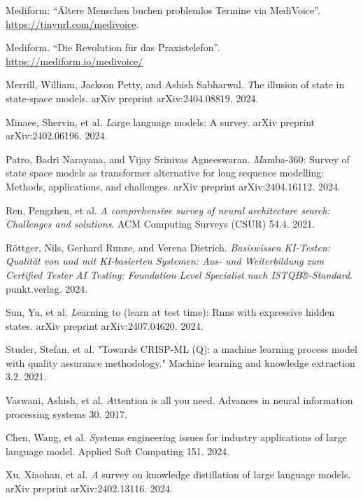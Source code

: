 \documentclass[twocolumn]{article}
\begin{document}
\begin{thebibliography}{99}
 Mediform: “Ältere Menschen buchen problemlos Termine via MediVoice”. \url{https://tinyurl.com/medivoice}.

 Mediform. “Die Revolution für das Praxistelefon”. \url{https://mediform.io/medivoice/}

 Merrill, William, Jackson Petty, and Ashish Sabharwal. {\emph The illusion of state in state-space models}. arXiv preprint arXiv:2404.08819. 2024.
  
 Minaee, Shervin, et al. {\emph Large language models: A survey}. arXiv preprint arXiv:2402.06196. 2024.

 Patro, Badri Narayana, and Vijay Srinivas Agneeswaran. {\emph Mamba-360: Survey of state space models as transformer alternative for long sequence modelling: Methods, applications, and challenges}. arXiv preprint arXiv:2404.16112. 2024.
  
 Ren, Pengzhen, et al. \emph{A comprehensive survey of neural architecture search: Challenges and solutions}. ACM Computing Surveys (CSUR) 54.4. 2021.
  
 Röttger, Nils, Gerhard Runze, and Verena Dietrich. \emph{Basiswissen KI-Testen: Qualität von und mit KI-basierten Systemen: Aus- und Weiterbildung zum Certified Tester AI Testing: Foundation Level Specialist nach ISTQB®-Standard}. punkt.verlag. 2024.

 Sun, Yu, et al. {\emph Learning to (learn at test time): Rnns with expressive hidden states}. arXiv preprint arXiv:2407.04620. 2024.
  
 Studer, Stefan, et al. "Towards CRISP-ML (Q): a machine learning process model with quality assurance methodology." Machine learning and knowledge extraction 3.2. 2021.

 Vaswani, Ashish, et al. {\emph Attention is all you need}. Advances in neural information processing systems 30. 2017.

 Chen, Wang, et al. {\emph Systems engineering issues for industry applications of large language model}. Applied Soft Computing 151. 2024.

 Xu, Xiaohan, et al. {\emph A survey on knowledge distillation of large language models}. arXiv preprint arXiv:2402.13116. 2024.
  
\end{thebibliography}
\end{document}
